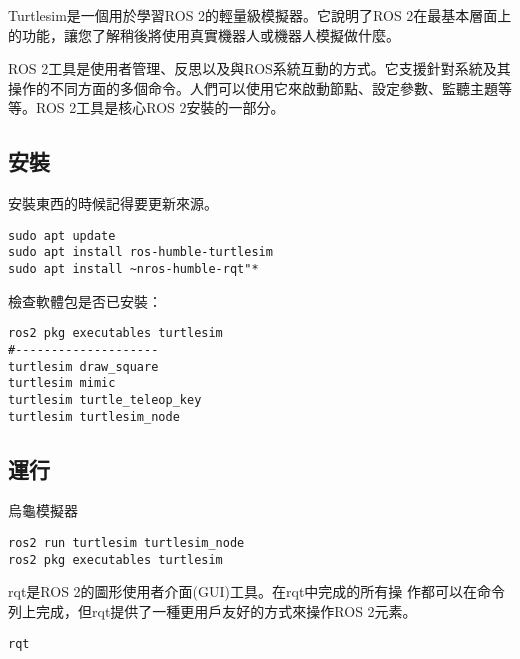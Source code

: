 Turtlesim是一個用於學習ROS 2的輕量級模擬器。它說明了ROS 2在最基本層面上的功能，讓您了解稍後將使用真實機器人或機器人模擬做什麼。

ROS 2工具是使用者管理、反思以及與ROS系統互動的方式。它支援針對系統及其操作的不同方面的多個命令。人們可以使用它來啟動節點、設定參數、監聽主題等等。ROS 2工具是核心ROS 2安裝的一部分。

\subsection*{安裝}
安裝東西的時候記得要更新來源。
\begin{verbatim}
sudo apt update
sudo apt install ros-humble-turtlesim
sudo apt install ~nros-humble-rqt"*
\end{verbatim}
檢查軟體包是否已安裝：
\begin{verbatim}
ros2 pkg executables turtlesim
#--------------------
turtlesim draw_square
turtlesim mimic
turtlesim turtle_teleop_key
turtlesim turtlesim_node
\end{verbatim}

\subsection*{運行}
烏龜模擬器
\begin{verbatim}
ros2 run turtlesim turtlesim_node
ros2 pkg executables turtlesim
\end{verbatim}

rqt是ROS 2的圖形使用者介面(GUI)工具。在rqt中完成的所有操
作都可以在命令列上完成，但rqt提供了一種更用戶友好的方式來操作ROS
2元素。
\begin{verbatim}
rqt
\end{verbatim}

